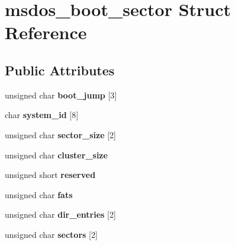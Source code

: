 \hypertarget{structmsdos__boot__sector}{}\section{msdos\+\_\+boot\+\_\+sector Struct Reference}
\label{structmsdos__boot__sector}
\subsection*{Public Attributes}
\begin{DoxyCompactItemize}
\item 
\mbox{\label{structmsdos__boot__sector_ad18c559059074c1025f95a257fa8d0d8}} 
unsigned char {\bfseries boot\+\_\+jump} \mbox{[}3\mbox{]}
\item 
\mbox{\label{structmsdos__boot__sector_a752209530efbd737d67b650772d03c12}} 
char {\bfseries system\+\_\+id} \mbox{[}8\mbox{]}
\item 
\mbox{\label{structmsdos__boot__sector_ac79671a8dc8d6a9dfb76d411e020ad59}} 
unsigned char {\bfseries sector\+\_\+size} \mbox{[}2\mbox{]}
\item 
\mbox{\label{structmsdos__boot__sector_a70c535da2f9cc70d13cdcc0ff8c34896}} 
unsigned char {\bfseries cluster\+\_\+size}
\item 
\mbox{\label{structmsdos__boot__sector_aef24f571d51f23950caef05fc2a21ae4}} 
unsigned short {\bfseries reserved}
\item 
\mbox{\label{structmsdos__boot__sector_a1f2f237a58243c89bbb150559fffab37}} 
unsigned char {\bfseries fats}
\item 
\mbox{\label{structmsdos__boot__sector_a79b383481a13657c6284db3015bb85ce}} 
unsigned char {\bfseries dir\+\_\+entries} \mbox{[}2\mbox{]}
\item 
\mbox{\label{structmsdos__boot__sector_a0bec88f8fe6259ccab5b30fb837b5380}} 
unsigned char {\bfseries sectors} \mbox{[}2\mbox{]}
\item 

\end{DoxyCompactItemize}
